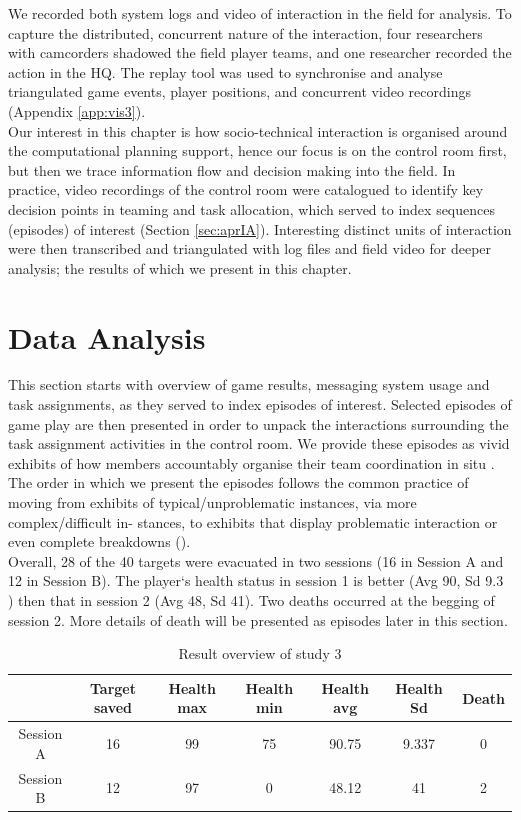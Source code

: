 We recorded both system logs and video of interaction in the field for analysis. To capture the distributed, concurrent nature of the interaction, four researchers with camcorders shadowed the field player teams, and one researcher recorded the action in the HQ. The replay tool was used to synchronise and analyse triangulated game events, player positions, and concurrent video recordings  (Appendix \ref{app:vis3}).\\

Our interest in this chapter is how socio-technical interaction is organised around the computational planning support, hence our focus is on the control room first, but then we trace information flow and decision making into the field. In practice, video recordings of the control room were catalogued to identify key decision points in teaming and task allocation, which served to index sequences (episodes) of interest (Section \ref{sec:aprIA}). Interesting distinct units of interaction were then transcribed and triangulated with log files and field video for deeper analysis; the results of which we present in this chapter.\\


\section{Data Analysis}
This section starts with overview of game results, messaging system usage and task assignments, as they served to index episodes of interest. Selected episodes of game play are then presented in order to unpack the interactions surrounding the task assignment activities in the control room. We provide these episodes as vivid exhibits of how members accountably organise their team coordination in situ \citep{Crabtree2012}. The order in which we present the episodes follows the common practice of moving from exhibits of typical/unproblematic instances, via more complex/difficult in- stances, to exhibits that display problematic interaction or even complete breakdowns (\citep{Heath2010}).\\

Overall, 28 of the 40 targets were evacuated in two sessions (16 in Session A and 12 in Session B). The player`s health status in session 1 is better  (Avg 90, Sd 9.3 ) then that in session 2 (Avg 48, Sd 41). Two deaths occurred at the begging of session 2. More details of death will be presented as episodes later in this section. \\

\begin{table}[h]
\centering
\footnotesize
\label{my-label}
\begin{tabular}{c|cccccc}
          & Target saved & Health max & Health min & Health avg & Health Sd & Death \\ \hline
Session A & 16           & 99         & 75         & 90.75      & 9.337     & 0     \\
Session B & 12           & 97         & 0          & 48.12      & 41        & 2    
\end{tabular}
\caption{Result overview of study 3}
\label{tab:ResultsOverview}
\end{table}


